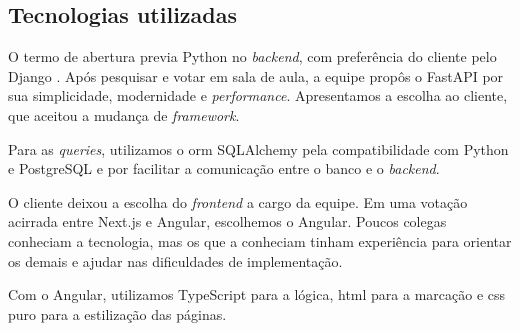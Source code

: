 \subsection{Tecnologias utilizadas}

  O termo de abertura previa Python \cite{python-docs} no \textit{backend},
com preferência do cliente pelo Django \cite{django-docs}. Após pesquisar e
votar em sala de aula, a equipe propôs o FastAPI por sua simplicidade,
modernidade e \textit{performance}. Apresentamos a escolha ao cliente, que
aceitou a mudança de \textit{framework}.

Para as \textit{queries}, utilizamos o \ac{orm} SQLAlchemy pela compatibilidade
com Python e PostgreSQL e por facilitar a comunicação entre o banco e o
\textit{backend}.

O cliente deixou a escolha do \textit{frontend} a cargo da equipe. Em uma
votação acirrada entre Next.js \cite{nextjs-docs} e Angular, escolhemos o Angular.
Poucos colegas conheciam a tecnologia, mas os que a conheciam tinham experiência
para orientar os demais e ajudar nas dificuldades de implementação.

Com o Angular, utilizamos TypeScript \cite{typescript-docs} para a lógica,
\ac{html} para a marcação e \ac{css} puro para a estilização das páginas.